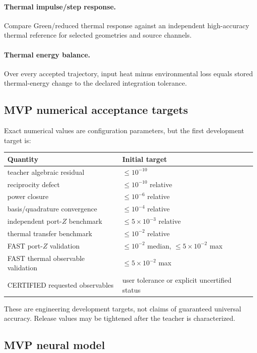 \paragraph{Thermal impulse/step response.}
Compare Green/reduced thermal response against an independent high-accuracy
thermal reference for selected geometries and source channels.

\paragraph{Thermal energy balance.}
Over every accepted trajectory,
input heat minus environmental loss equals stored thermal-energy change to the
declared integration tolerance.

\subsection{MVP numerical acceptance targets}

Exact numerical values are configuration parameters, but the first development
target is:
\begin{center}
\begin{tabular}{ll}
\toprule
Quantity & Initial target\\
\midrule
teacher algebraic residual & $\le10^{-10}$\\
reciprocity defect & $\le10^{-10}$ relative\\
power closure & $\le10^{-6}$ relative\\
basis/quadrature convergence & $\le10^{-4}$ relative\\
independent port-$Z$ benchmark & $\le5\times10^{-3}$ relative\\
thermal transfer benchmark & $\le10^{-2}$ relative\\
FAST port-$Z$ validation & $\le10^{-2}$ median, $\le5\times10^{-2}$ max\\
FAST thermal observable validation & $\le5\times10^{-2}$ max\\
CERTIFIED requested observables & user tolerance or explicit uncertified status\\
\bottomrule
\end{tabular}
\end{center}
These are engineering development targets, not claims of guaranteed universal
accuracy. Release values may be tightened after the teacher is characterized.

\subsection{MVP neural model}

